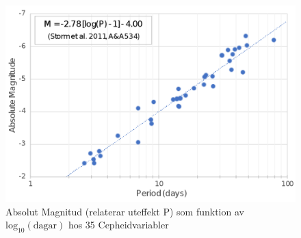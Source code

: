 \documentclass[./exercises.tex]{subfiles}
\begin{document}
\begin{figure}[H]
\begin{center}
  \includegraphics[width=\linewidth]{1280px-Storm2011_Cepheid_Data.svg.png}
  \caption{Absolut Magnitud (relaterar uteffekt P) som funktion av $\text{log}_{10}(\text{dagar})$ hos 35 Cepheidvariabler }
  \end{center}
  \label{fig4}
\end{figure}
\end{document}
